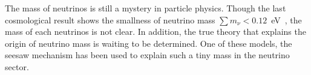 \documentclass[aps,prd,nofootinbib,preprint]{revtex4}
\begin{document}
{\color{blue}
The mass of neutrinos is still a mystery in particle physics.  
Though the last cosmological result shows the smallness of neutrino mass $\sum m_\nu<0.12$~eV~\cite{Aghanim:2018eyx}, the mass of each neutrinos is not clear.
In addition, the true theory that explains the origin of neutrino mass is waiting to be determined. 
One of these models, the seesaw mechanism has been used to explain such a tiny mass in the neutrino sector.}
\end{document}
